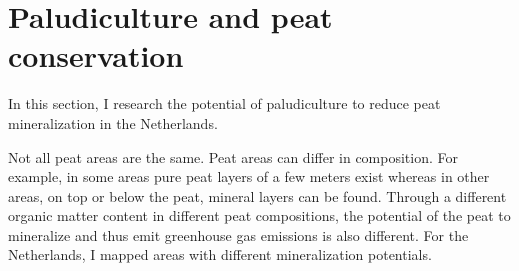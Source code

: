 \documentclass[12pt,a4paper,titlepage]{article}
\begin{document}




\section{Paludiculture and peat conservation}

In this section, I research the potential of paludiculture to reduce peat mineralization in the Netherlands.

Not all peat areas are the same. Peat areas can differ in composition. For example, in some areas pure peat layers of a few meters exist whereas in other areas, on top or below the peat, mineral layers can be found. Through a different organic matter content in different peat compositions, the potential of the peat to mineralize and thus emit greenhouse gas emissions is also different. For the Netherlands, I mapped areas with different mineralization potentials.
\end{document}
